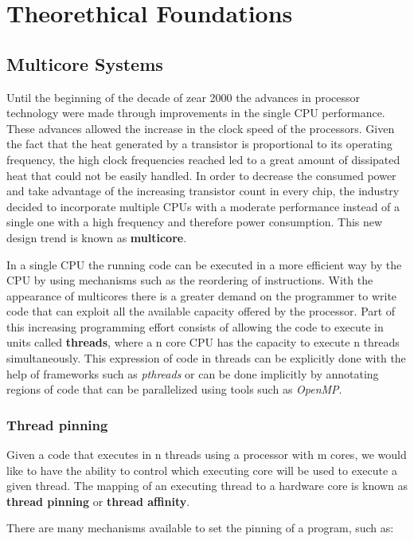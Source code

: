 \chapter{Theorethical Foundations}\label{chapter:theorethical}
\section{Multicore Systems}\label{section:multicore}
Until the beginning of the decade of zear 2000 the advances in processor technology were made through improvements in the single CPU performance. These advances allowed the increase in the clock speed of the processors. Given the fact that the heat generated by a transistor is proportional to its operating frequency, the high clock frequencies reached led to a great amount of dissipated heat that could not be easily handled. In order to decrease the consumed power and take advantage of the increasing transistor count in every chip, the industry decided to incorporate multiple CPUs with a moderate performance instead of a single one with a high frequency and therefore power consumption. This new design trend is known as \textbf{multicore}. 

In a single CPU the running code can be executed in a more efficient way by the CPU by using mechanisms such as the reordering of instructions. With the appearance of multicores there is a greater demand on the programmer to write code that can exploit all the available capacity offered by the processor. Part of this increasing programming effort consists of allowing the code to execute in units called \textbf{threads}, where a n core CPU has the capacity to execute n threads simultaneously. This expression of code in threads can be explicitly done with the help of frameworks such as \textit{pthreads} or can be done implicitly by annotating regions of code that can be parallelized using tools such as \textit{OpenMP}.

\subsection{Thread pinning}\label{subsection:pinning}
Given a code that executes in n threads using a processor with m cores, we would like to have the ability to control which executing core will be used to execute a given thread. The mapping of an executing thread to a hardware core is known as \textbf{thread pinning} or \textbf{thread affinity}.

There are many mechanisms available to set the pinning of a program, such as:

